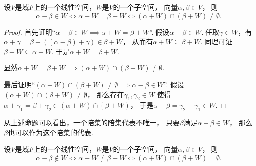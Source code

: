 \begin{theorem}
设\(V\)是域\(F\)上的一个线性空间，\(W\)是\(V\)的一个子空间，
向量\(\alpha,\beta \in V\)，
则\begin{equation*}
	\alpha - \beta \in W
	\iff
	\alpha + W = \beta + W
	\iff
	(\alpha + W) \cap (\beta + W) \neq \emptyset.
\end{equation*}
\begin{proof}
首先证明“\(
	\alpha - \beta \in W
	\implies
	\alpha + W = \beta + W
\)”.
假设\(\alpha - \beta \in W\).
任取\(\gamma \in W\)，有\(
	\alpha + \gamma
	= \beta + ((\alpha - \beta) + \gamma)
	\in \beta + W
\)，
从而有\(\alpha + W \subseteq \beta + W\).
同理可证\(\beta + W \subseteq \alpha + W\).
于是\(\alpha + W = \beta + W\).

显然\(
	\alpha + W = \beta + W
	\implies
	(\alpha + W) \cap (\beta + W) \neq \emptyset
\).

最后证明“\(
	(\alpha + W) \cap (\beta + W) \neq \emptyset
	\implies
	\alpha - \beta \in W
\)”.
假设\((\alpha + W) \cap (\beta + W) \neq \emptyset\)，
那么存在\(\gamma_1,\gamma_2 \in W\)
使得\(\alpha + \gamma_1 = \beta + \gamma_2 \in (\alpha + W) \cap (\beta + W)\)，
于是\(\alpha - \beta = \gamma_2 - \gamma_1 \in W\).
\end{proof}
\end{theorem}
\begin{remark}
从上述命题可以看出，一个陪集的陪集代表不唯一，
只要\(\beta\)满足\(\alpha-\beta \in W\)，
那么\(\beta\)也可以作为这个陪集的代表.
\end{remark}

\begin{corollary}
设\(V\)是域\(F\)上的一个线性空间，\(W\)是\(V\)的一个子空间，
向量\(\alpha,\beta \in V\)，
则\begin{equation*}
	\alpha - \beta \notin W
	\iff
	\alpha + W \neq \beta + W
	\iff
	(\alpha + W) \cap (\beta + W) = \emptyset.
\end{equation*}
\end{corollary}

